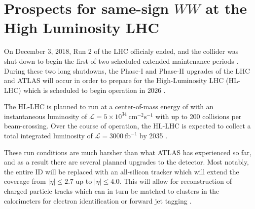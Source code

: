 \chapter[Prospects for same-sign $WW$ at the High Luminosity LHC][Prospects for same-sign $WW$ at the High Luminosity LHC]{Prospects for same-sign $WW$ at the High Luminosity LHC}
\label{ch:sswwupgrade}


On December 3, 2018, Run 2 of the LHC officialy ended, and the collider was shut down to begin the first of two scheduled extended maintenance periods \cite{2018.cern-press-run2}.
During these two long shutdowns, the Phase-I and Phase-II upgrades of the LHC and ATLAS will occur in order to prepare for the High-Luminosity LHC (HL-LHC) which is scheduled to begin operation in 2026 \cite{2011.atlas-phase1-loi}.

The HL-LHC is planned to run at a center-of-mass energy of  with an instantaneous luminosity of $\mathcal{L}=5\times 10^{34}~\textrm{cm}^{-2}\textrm{s}^{-1}$ with up to 200 collisions per beam-crossing. 
Over the course of operation, the HL-LHC is expected to collect a total integrated luminosity of $\mathcal{L} = 3000~\mathrm{fb}^{-1}$ by 2035 \cite{2015.hllhc-design-report}.

These run conditions are much harsher than what ATLAS has experienced so far, and as a result there are several planned upgrades to the detector.
Most notably, the entire ID will be replaced with an all-silicon tracker which will extend the coverage from $|\eta| \le 2.7$ up to $|\eta| \le 4.0$.
This will allow for reconstruction of charged particle tracks which can in turn be matched to clusters in the calorimeters for electron identification or forward jet tagging \cite{2015.atlas-phase2-scoping}.

